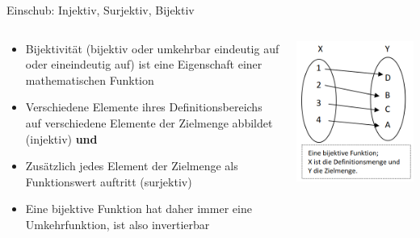 \documentclass[12pt%
,aspectratio=169%
]{beamer}
\begin{document}
\begin{frame}{Einschub: Injektiv, Surjektiv, Bijektiv}
\begin{columns}[T] %
\begin{column}{.58\textwidth}
\begin{itemize}
	\item Bijektivität (bijektiv oder umkehrbar eindeutig auf oder eineindeutig auf) ist eine Eigenschaft einer mathematischen Funktion
	\item Verschiedene Elemente ihres Definitionsbereichs auf verschiedene Elemente der Zielmenge abbildet (injektiv) \textbf{und}
	\item Zusätzlich jedes Element der Zielmenge als Funktionswert auftritt (surjektiv)
	\item Eine bijektive Funktion hat daher immer eine Umkehrfunktion, ist also invertierbar
\end{itemize}
\end{column}%
\hfill%
\begin{column}{.38\textwidth}
\centering
\includegraphics[scale=0.4]{pictures/bijektiv}
\end{column}%
\end{columns}
\end{frame}
\end{document}

